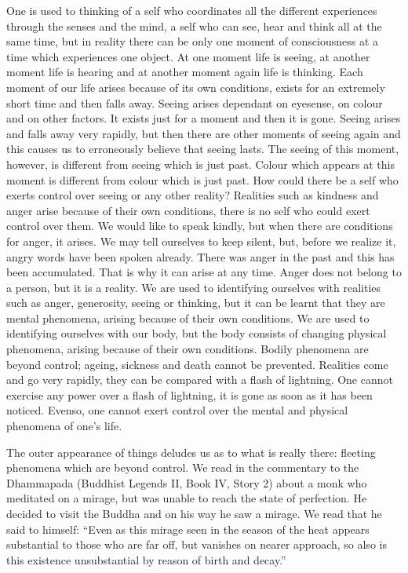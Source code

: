 \documentclass{book}
\begin{document}
One is used to thinking of a self who coordinates all the different
experiences through the senses and the mind, a self who can see, hear
and think all at the same time, but in reality there can be only one
moment of consciousness at a time which experiences one object. At one
moment life is seeing, at another moment life is hearing and at another
moment again life is thinking. Each moment of our life arises because of
its own conditions, exists for an extre­mely short time and then falls
away. Seeing arises dependant on eyesense, on colour and on other
factors. It exists just for a moment and then it is gone. Seeing arises
and falls away very rapidly, but then there are other moments of seeing
again and this causes us to erro­neously believe that seeing lasts. The
seeing of this moment, however, is different from seeing which is just
past. Colour which appears at this moment is different from colour which
is just past. How could there be a self who exerts control over seeing
or any other reality? Realities such as kindness and anger arise because
of their own conditions, there is no self who could exert control over
them. We would like to speak kindly, but when there are conditions for
anger, it arises. We may tell ourselves to keep silent, but, before we
realize it, angry words have been spoken already. There was anger in the
past and this has been accumulated. That is why it can arise at any
time. Anger does not belong to a person, but it is a reality. We are
used to identifying ourselves with realities such as anger, generosity,
seeing or thinking, but it can be learnt that they are mental phenomena,
arising because of their own conditions. We are used to identifying
ourselves with our body, but the body consists of changing physical
phenomena, arising because of their own conditions. Bodily phenomena are
beyond control; ageing, sickness and death cannot be prevented.
Realities come and go very rapidly, they can be compared with a flash of
lightning. One cannot exercise any power over a flash of lightning, it
is gone as soon as it has been noticed. Evenso, one cannot exert control
over the mental and physical phenomena of one's life.

The outer appearance of things deludes us as to what is really there:
fleeting phenomena which are beyond control. We read in the commentary
to the Dhammapada (Buddhist Legends II, Book IV, Story 2) about a monk
who meditated on a mirage, but was unable to reach the state of
perfection. He decided to visit the Buddha and on his way he saw a
mirage. We read that he said to himself: ``Even as this mirage seen in
the season of the heat appears substantial to those who are far off, but
vanishes on nearer approach, so also is this existence unsubstantial by
reason of birth and decay.''
\end{document}
